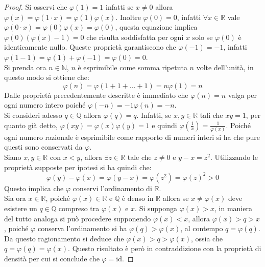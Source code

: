 \begin{proof}
	Si osservi che $\varphi(1)=1$ infatti se $x\neq0$ allora $\varphi(x)=\varphi(1\cdot x)=\varphi(1)\varphi(x)$. Inoltre $\varphi(0)=0$, infatti $\forall x\in\mathbb{R}$ vale $\varphi(0\cdot x)=\varphi(0)\varphi(x)=\varphi(0)$, questa equazione implica $\varphi(0)(\varphi(x)-1)=0$ che risulta soddisfatta per ogni $x$ solo se $\varphi(0)$ è identicamente nullo. Queste proprietà garantiscono che $\varphi(-1)=-1$, infatti $\varphi(1-1)=\varphi(1)+\varphi(-1)=\varphi(0)=0$.\\
	Si prenda ora $n\in\mathbb{N}$, $n$ è esprimibile come somma ripetuta $n$ volte dell'unità, in questo modo si ottiene che:
	\begin{equation*}
		\varphi(n)=\varphi(1+1+...+1)=n\varphi(1)=n
	\end{equation*}
	Dalle proprietà precedentemente descritte è immediato che $\varphi(n)=n$ valga per ogni numero intero poiché $\varphi(-n)=-1\varphi(n)=-n$.\\
	Si consideri adesso $q\in \mathbb{Q}$ allora $\varphi(q)=q$. Infatti, se $x,y\in\mathbb{R}$ tali che $xy=1$, per quanto già detto, $\varphi(xy)=\varphi(x)\varphi(y)=1$ e quindi $\varphi(\frac{1}{x})=\frac{1}{\varphi(x)}$. Poiché ogni numero razionale è esprimibile come rapporto di numeri interi si ha che pure questi sono conservati da $\varphi$.\\
	Siano $x,y\in \mathbb{R}$ con $x<y$, allora $\exists z\in\mathbb{R}$ tale che $z\neq0$ e $y-x=z^2$. Utilizzando le proprietà supposte per ipotesi si ha quindi che:
	\begin{equation*}
		\varphi(y)-\varphi(x)=\varphi(y-x)=\varphi(z^2)=\varphi(z)^2>0
	\end{equation*}
	Questo implica che $\varphi$ conservi l'ordinamento di $\mathbb{R}$.\\
	Sia ora $x\in\mathbb{R}$, poiché $\varphi(x)\in\mathbb{R}$ e $\mathbb{Q}$ è denso in $\mathbb{R}$ allora se $x\neq\varphi(x)$ deve esistere un $q\in\mathbb{Q}$ compreso tra $\varphi(x)$ e $x$. Si supponga $\varphi(x)>x$, in maniera del tutto analoga si può procedere supponendo $\varphi(x)<x$, allora $\varphi(x)> q> x$, poiché $\varphi$ conserva l'ordinamento si ha $\varphi(q)>\varphi(x)$, al contempo $q=\varphi(q)$. Da questo ragionamento si deduce che $\varphi(x)> q>\varphi(x)$, ossia che $q=\varphi(q)=\varphi(x)$. Questo risultato è però in contraddizione con la proprietà di densità per cui si conclude che $\varphi=\text{id}$.
\end{proof}


